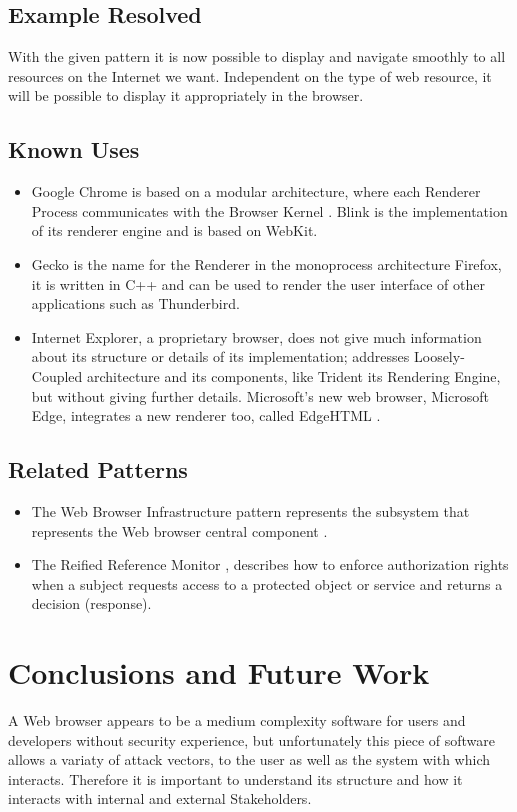 \documentclass[prodmode,acmtecs]{acmsmall}
\begin{document}
  \subsection*{Example Resolved}
With the given pattern it is now possible to display and navigate smoothly to all resources on the Internet we want. Independent on the type of web resource, it will be possible to display it appropriately in the browser. 
  \subsection*{Known Uses}
  \begin{itemize}\leftskip0.2em
    \item Google Chrome is based on a modular architecture, where each Renderer Process communicates with the Browser Kernel \cite{multiProcGC}. Blink is the implementation of its renderer engine and is based on WebKit.
    \item Gecko \cite{gecko2} is the name for the Renderer in the monoprocess architecture Firefox, it is written in C++ and can be used to render the user interface of other applications such as Thunderbird.
    \item Internet Explorer, a proprietary browser, does not give much information about its structure or details of its implementation; \cite{Crowley2010} addresses Loosely-Coupled architecture \cite{IE8-LCIE} and its components, like Trident its Rendering Engine, but without giving further details. Microsoft's new web browser, Microsoft Edge, integrates a new renderer too, called EdgeHTML \cite{edgehtml}.
  \end{itemize}

  \subsection*{Related Patterns}
  \begin{itemize}\leftskip0.2em
    \item The Web Browser Infrastructure pattern represents the subsystem that represents the Web browser central component \cite{silva2015}. 
    \item The Reified Reference Monitor \cite{fernandez2013security}, describes how to enforce authorization rights when a subject requests access to a protected object or service and returns a decision (response). 
  \end{itemize}

\section{Conclusions and Future Work}
A Web browser appears to be a medium complexity software for users and developers without security experience, but unfortunately this piece of software allows a variaty of attack vectors, to the user as well as the system with which interacts. Therefore it is important to understand its structure and how it interacts with internal and external Stakeholders.
\end{document}
